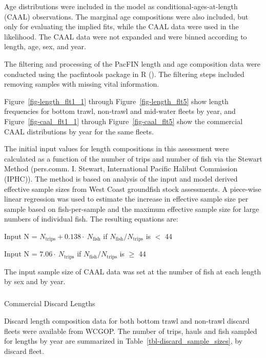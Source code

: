 \documentclass[
]{scrartcl}
\makeatletter
\let\oldsubparagraph\subparagraph
\renewcommand{\subparagraph}{
    \@ifstar
      \xxxSubParagraphStar
      \xxxSubParagraphNoStar
  }
\newcommand{\xxxSubParagraphStar}[1]{\oldsubparagraph*{#1}\mbox{}}
\newcommand{\xxxSubParagraphNoStar}[1]{\oldsubparagraph{#1}\mbox{}}
\makeatother
\begin{document}
Age distributions were included in the model as
conditional-ages-at-length (CAAL) observations. The marginal age
compositions were also included, but only for evaluating the implied
fits, while the CAAL data were used in the likelihood. The CAAL data
were not expanded and were binned according to length, age, sex, and
year.

The filtering and processing of the PacFIN length and age composition
data were conducted using the \gls{pacfintools} package in R
(). The filtering steps included removing samples with missing vital
information.

Figure~\ref{fig-length_flt1_1} through Figure~\ref{fig-length_flt5} show
length frequencies for bottom trawl, non-trawl and mid-water fleets by
year, and Figure~\ref{fig-caal_flt1_1} through
Figure~\ref{fig-caal_flt5} show the commercial CAAL distributions by
year for the same fleets.

The initial input values for length compositions in this assessment were
calculated as a function of the number of trips and number of fish via
the Stewart Method (pers.comm. I. Stewart, International Pacific Halibut
Commission (IPHC)). The method is based on analysis of the input and
model derived effective sample sizes from West Coast groundfish stock
assessments. A piece-wise linear regression was used to estimate the
increase in effective sample size per sample based on fish-per-sample
and the maximum effective sample size for large numbers of individual
fish. The resulting equations are:

\begin{centering}

Input N = $N_{\text{trips}} + 0.138 \cdot \ N_{\text{fish}}$ if $N_{\text{fish}}/N_{\text{trips}}$ is $<$ 44

Input N = $7.06 \cdot \ N_{\text{trips}}$ if $N_{\text{fish}}/N_{\text{trips}}$ is $\geq$ 44


\end{centering}

The input sample size of CAAL data was set at the number of fish at each
length by sex and by year.

\subparagraph{Commercial Discard
Lengths}\label{commercial-discard-lengths}

Discard length composition data for both bottom trawl and non-trawl
discard fleets were available from WCGOP. The number of trips, hauls and
fish sampled for lengths by year are summarized in
Table~\ref{tbl-discard_sample_sizes}, by discard fleet.
\end{document}
